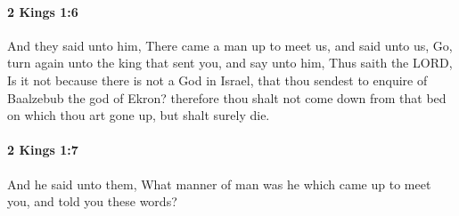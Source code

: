 		\paragraph{2 Kings 1:6} %
			\label{2KINGS-1-6}

			And they said unto him, There came a man up to meet us, and said unto us, Go, turn again unto the king that sent you, and say unto him, Thus saith the LORD, Is it not because there is not a God in Israel, that thou sendest to enquire of Baalzebub the god of Ekron? therefore thou shalt not come down from that bed on which thou art gone up, but shalt surely die.


		\paragraph{2 Kings 1:7} %
			\label{2KINGS-1-7}

			And he said unto them, What manner of man was he which came up to meet you, and told you these words?

